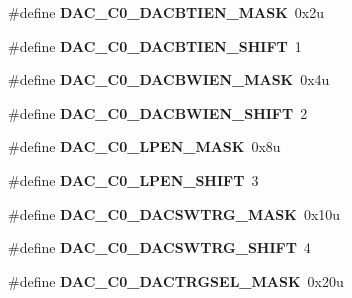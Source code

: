 \begin{DoxyCompactItemize}
\item 
\#define {\bfseries D\+A\+C\+\_\+\+C0\+\_\+\+D\+A\+C\+B\+T\+I\+E\+N\+\_\+\+M\+A\+SK}~0x2u\hypertarget{group__DAC__Register__Masks_gad8a60a2fa6211ff08bba4b9648fb8daa}{}\label{group__DAC__Register__Masks_gad8a60a2fa6211ff08bba4b9648fb8daa}

\item 
\#define {\bfseries D\+A\+C\+\_\+\+C0\+\_\+\+D\+A\+C\+B\+T\+I\+E\+N\+\_\+\+S\+H\+I\+FT}~1\hypertarget{group__DAC__Register__Masks_ga1f8eb9a96341365badba1280bed49e05}{}\label{group__DAC__Register__Masks_ga1f8eb9a96341365badba1280bed49e05}

\item 
\#define {\bfseries D\+A\+C\+\_\+\+C0\+\_\+\+D\+A\+C\+B\+W\+I\+E\+N\+\_\+\+M\+A\+SK}~0x4u\hypertarget{group__DAC__Register__Masks_gaedff72359a12b93e4b61a57a0613d3cb}{}\label{group__DAC__Register__Masks_gaedff72359a12b93e4b61a57a0613d3cb}

\item 
\#define {\bfseries D\+A\+C\+\_\+\+C0\+\_\+\+D\+A\+C\+B\+W\+I\+E\+N\+\_\+\+S\+H\+I\+FT}~2\hypertarget{group__DAC__Register__Masks_ga2b61f6fc85e9dc9d7c736055b47fadd1}{}\label{group__DAC__Register__Masks_ga2b61f6fc85e9dc9d7c736055b47fadd1}

\item 
\#define {\bfseries D\+A\+C\+\_\+\+C0\+\_\+\+L\+P\+E\+N\+\_\+\+M\+A\+SK}~0x8u\hypertarget{group__DAC__Register__Masks_ga54a04b9ae84c5a4f8977ae2e1a889717}{}\label{group__DAC__Register__Masks_ga54a04b9ae84c5a4f8977ae2e1a889717}

\item 
\#define {\bfseries D\+A\+C\+\_\+\+C0\+\_\+\+L\+P\+E\+N\+\_\+\+S\+H\+I\+FT}~3\hypertarget{group__DAC__Register__Masks_ga97aaa812a3938df3559cb40b893db431}{}\label{group__DAC__Register__Masks_ga97aaa812a3938df3559cb40b893db431}

\item 
\#define {\bfseries D\+A\+C\+\_\+\+C0\+\_\+\+D\+A\+C\+S\+W\+T\+R\+G\+\_\+\+M\+A\+SK}~0x10u\hypertarget{group__DAC__Register__Masks_ga7e785d90fec3c1817fc53fea41f41644}{}\label{group__DAC__Register__Masks_ga7e785d90fec3c1817fc53fea41f41644}

\item 
\#define {\bfseries D\+A\+C\+\_\+\+C0\+\_\+\+D\+A\+C\+S\+W\+T\+R\+G\+\_\+\+S\+H\+I\+FT}~4\hypertarget{group__DAC__Register__Masks_ga25e2afd71ee5cc41adde6f072c9d2604}{}\label{group__DAC__Register__Masks_ga25e2afd71ee5cc41adde6f072c9d2604}

\item 
\#define {\bfseries D\+A\+C\+\_\+\+C0\+\_\+\+D\+A\+C\+T\+R\+G\+S\+E\+L\+\_\+\+M\+A\+SK}~0x20u\hypertarget{group__DAC__Register__Masks_gac6dd81bc6500fc4b972c62bde339f31d}{}\label{group__DAC__Register__Masks_gac6dd81bc6500fc4b972c62bde339f31d}


\end{DoxyCompactItemize}
